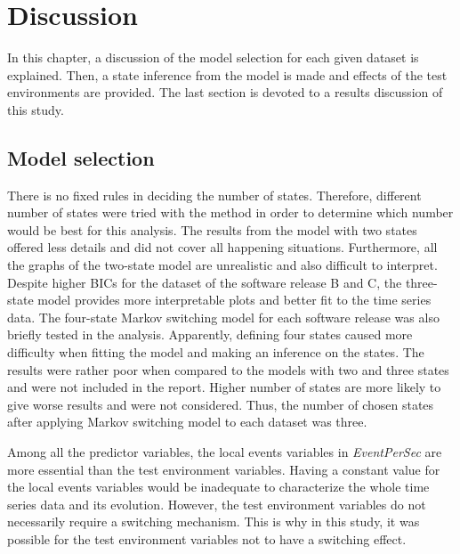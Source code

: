 
\lhead[\chaptername~\thechapter]{\rightmark}

\rhead[\leftmark]{}

\lfoot[\thepage]{}

\cfoot{}

\rfoot[]{\thepage}

\chapter{Discussion\label{chap:Discussion}}

In this chapter, a discussion of the model selection for each given
dataset is explained. Then, a state inference from the model is made
and effects of the test environments are provided. The last section
is devoted to a results discussion of this study.

\section{Model selection \label{subsec:Model-selection}}

There is no fixed rules in deciding the number of states. Therefore,
different number of states were tried with the method in order to
determine which number would be best for this analysis. The results
from the model with two states offered less details and did not cover
all happening situations. Furthermore, all the graphs of the two-state
model are unrealistic and also difficult to interpret. Despite higher
BICs for the dataset of the software release B and C, the three-state
model provides more interpretable plots and better fit to the time
series data. The four-state Markov switching model for each software
release was also briefly tested in the analysis. Apparently, defining
four states caused more difficulty when fitting the model and making
an inference on the states. The results were rather poor when compared
to the models with two and three states and were not included in the
report. Higher number of states are more likely to give worse results
and were not considered. Thus, the number of chosen states after applying
Markov switching model to each dataset was three. 

Among all the predictor variables, the local events variables in \emph{EventPerSec}
are more essential than the test environment variables. Having a constant
value for the local events variables would be inadequate to characterize
the whole time series data and its evolution. However, the test environment
variables do not necessarily require a switching mechanism. This is
why in this study, it was possible for the test environment variables
not to have a switching effect. %
\begin{comment}
In \ref{sec:Switching}, a hypothesis that the test environment variable
was possible to not have a switching effect was made. 

for each test case and should have flexible values in each of the
fixed number of state. Although these test environment variables affect
the CPU utilization, they do not need to have different values in
each state.
\end{comment}

